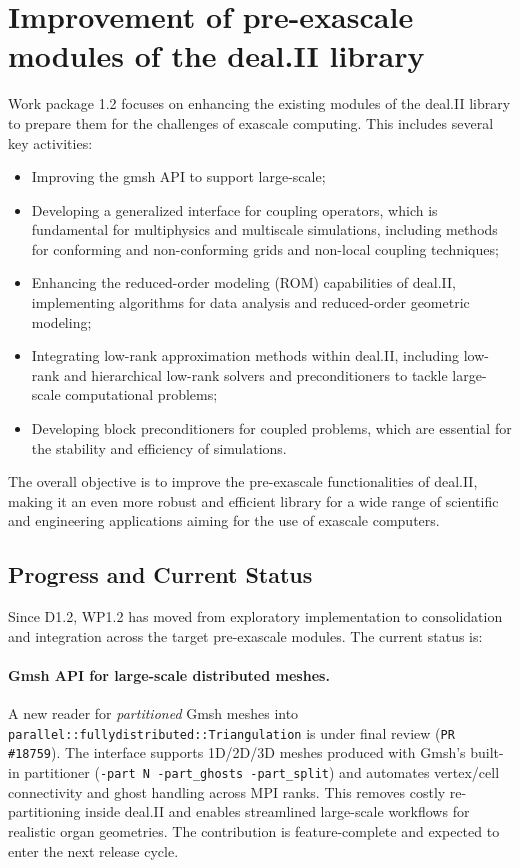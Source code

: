 \documentclass[a4paper,12pt]{article}
\begin{document}
\section{Improvement of pre-exascale modules of the deal.II library}

Work package 1.2 focuses on enhancing the existing modules of the deal.II
library to prepare them for the challenges of exascale computing. This includes
several key activities: 
\begin{itemize}
    \item Improving the gmsh API to support large-scale;
    \item Developing a generalized interface for coupling operators, which
    is fundamental for multiphysics and multiscale simulations, including methods
    for conforming and non-conforming grids and non-local coupling techniques;
    \item Enhancing the reduced-order modeling (ROM) capabilities of deal.II,
    implementing algorithms for data analysis and reduced-order geometric modeling;
    \item Integrating low-rank approximation methods within deal.II, including
    low-rank and hierarchical low-rank solvers and preconditioners to tackle
    large-scale computational problems;
    \item Developing block preconditioners for coupled problems, which are
    essential for the stability and efficiency of simulations.
\end{itemize}
 
The overall objective is to improve the pre-exascale functionalities of deal.II,
making it an even more robust and efficient library for a wide range of
scientific and engineering applications aiming for the use of exascale
computers.

\subsection{Progress and Current Status}

Since D1.2, WP1.2 has moved from exploratory implementation to consolidation and
integration across the target pre-exascale modules. The current status is:

\paragraph{Gmsh API for large-scale distributed meshes.}
A new reader for \emph{partitioned} Gmsh meshes into
\texttt{parallel::fullydistributed::Triangulation} is under final review
(\texttt{PR \#18759}). The interface supports 1D/2D/3D meshes produced with
Gmsh's built-in partitioner (\verb|-part N -part_ghosts -part_split|) and
automates vertex/cell connectivity and ghost handling across MPI ranks. This
removes costly re-partition\-ing inside deal.II and enables streamlined
large-scale workflows for realistic organ geometries. The contribution is
feature-complete and expected to enter the next release cycle.
\end{document}
